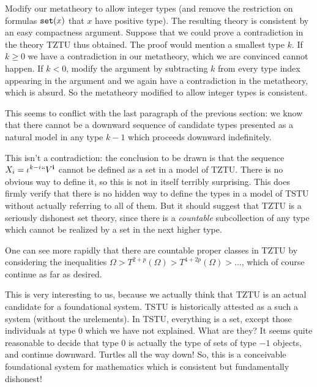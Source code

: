 \documentclass[12pt]{article}
\begin{document}
Modify our metatheory to allow integer types (and remove the restriction on formulas ${\tt set}(x)$ that $x$ have positive type).  The resulting theory is consistent by an easy compactness argument.  Suppose that we could prove a contradiction in the theory TZTU thus obtained.  The proof would mention a smallest type $k$.  If $k \geq 0$ we have a contradiction in our metatheory, which we are convinced cannot happen.  If $k<0$, modify the argument by subtracting $k$ from every type index appearing in the argument and we again have a contradiction in the metatheory, which is absurd.  So the metatheory modified to allow integer types is consistent.

This seems to conflict with the last paragraph of the previous section:  we know that there cannot be a downward sequence of candidate types presented as a natural model in
any type $k-1$ which proceeds downward indefinitely.

This isn't a contradiction:  the conclusion to be drawn is that the sequence $X_i = \iota^{k-i}``V^{\bf i}$ cannot be defined as a set in a model of TZTU.  There is no obvious way to define it, so this is not in itself terribly surprising.  This does firmly verify that there is no hidden way to define the types in a model of TSTU without actually referring to all of them.  But it should suggest that TZTU is a seriously dishonest set theory, since there is a {\em countable\/} subcollection of any type which cannot be realized by a set in the next higher type.

One can see more rapidly that there are countable proper classes in TZTU by considering the inequalities $\Omega > T^{2+p}(\Omega) > T^{4+2p}(\Omega) > \dots$, which of course continue as far as desired.

This is very interesting to us, because we actually think that TZTU is an actual candidate for a foundational system.  TSTU is historically attested as a such a system (without the urelements).  In TSTU, everything is a set, except those individuals at type 0 which we have not explained.  What are they?  It seems quite reasonable to decide that type 0
is actually the type of sets of type $-1$ objects, and continue downward.  Turtles all the way down!  So, this is a conceivable foundational system for mathematics which is consistent but fundamentally dishonest!
\end{document}
